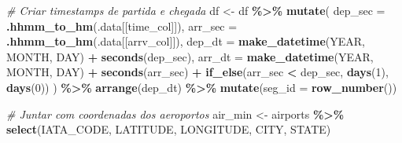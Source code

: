 \documentclass[
]{article}
\newenvironment{Shaded}{\begin{snugshade}}{\end{snugshade}}
\newcommand{\AttributeTok}[1]{\textcolor[rgb]{0.13,0.29,0.53}{#1}}
\newcommand{\CommentTok}[1]{\textcolor[rgb]{0.56,0.35,0.01}{\textit{#1}}}
\newcommand{\DecValTok}[1]{\textcolor[rgb]{0.00,0.00,0.81}{#1}}
\newcommand{\FunctionTok}[1]{\textcolor[rgb]{0.13,0.29,0.53}{\textbf{#1}}}
\newcommand{\NormalTok}[1]{#1}
\newcommand{\OtherTok}[1]{\textcolor[rgb]{0.56,0.35,0.01}{#1}}
\newcommand{\SpecialCharTok}[1]{\textcolor[rgb]{0.81,0.36,0.00}{\textbf{#1}}}
\begin{document}
\begin{Shaded}
\begin{Highlighting}[]
  \CommentTok{\# Criar timestamps de partida e chegada}
\NormalTok{  df }\OtherTok{\textless{}{-}}\NormalTok{ df }\SpecialCharTok{\%\textgreater{}\%}
    \FunctionTok{mutate}\NormalTok{(}
      \AttributeTok{dep\_sec  =} \FunctionTok{.hhmm\_to\_hm}\NormalTok{(.data[[time\_col]]),}
      \AttributeTok{arr\_sec  =} \FunctionTok{.hhmm\_to\_hm}\NormalTok{(.data[[arrv\_col]]),}
      \AttributeTok{dep\_dt   =} \FunctionTok{make\_datetime}\NormalTok{(YEAR, MONTH, DAY) }\SpecialCharTok{+} \FunctionTok{seconds}\NormalTok{(dep\_sec),}
      \AttributeTok{arr\_dt   =} \FunctionTok{make\_datetime}\NormalTok{(YEAR, MONTH, DAY) }\SpecialCharTok{+} \FunctionTok{seconds}\NormalTok{(arr\_sec) }\SpecialCharTok{+}
        \FunctionTok{if\_else}\NormalTok{(arr\_sec }\SpecialCharTok{\textless{}}\NormalTok{ dep\_sec, }\FunctionTok{days}\NormalTok{(}\DecValTok{1}\NormalTok{), }\FunctionTok{days}\NormalTok{(}\DecValTok{0}\NormalTok{))}
\NormalTok{    ) }\SpecialCharTok{\%\textgreater{}\%}
    \FunctionTok{arrange}\NormalTok{(dep\_dt) }\SpecialCharTok{\%\textgreater{}\%}
    \FunctionTok{mutate}\NormalTok{(}\AttributeTok{seg\_id =} \FunctionTok{row\_number}\NormalTok{())}
  
  \CommentTok{\# Juntar com coordenadas dos aeroportos}
\NormalTok{  air\_min }\OtherTok{\textless{}{-}}\NormalTok{ airports }\SpecialCharTok{\%\textgreater{}\%} \FunctionTok{select}\NormalTok{(IATA\_CODE, LATITUDE, LONGITUDE, CITY, STATE)}
  

\end{Highlighting}
\end{Shaded}
\end{document}
